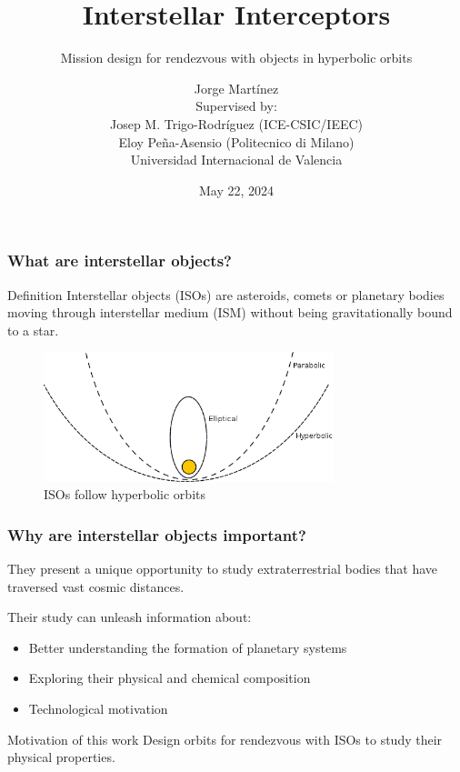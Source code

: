\documentclass[xcolor={dvipsnames}]{beamer}
\title[About Beamer] %
{Interstellar Interceptors}
\subtitle{Mission design for rendezvous with objects in hyperbolic orbits}
\author[Martínez, Jorge] %
{
    Jorge Martínez\\
    \vspace{1cm}
    Supervised by:\\
    \vspace{0.5cm}
    Josep M. Trigo-Rodríguez (ICE-CSIC/IEEC)\\
    Eloy Peña-Asensio (Politecnico di Milano)\\
    \vspace{0.5cm}
    \footnotesize{Universidad Internacional de Valencia}
}
\date{May 22, 2024}
\begin{document}
\frame{\titlepage}

\begin{frame}
\frametitle{What are interstellar objects?}

\begin{block}{Definition}
    Interstellar objects (ISOs) are asteroids, comets or planetary bodies moving
    through interstellar medium (ISM) without being gravitationally bound to a
    star.
\end{block}

\begin{figure}[h]
    \centering
    \includegraphics[width=0.75\textwidth]{fig/static/orbits.png}
    \caption{ISOs follow hyperbolic orbits}
    \label{fig:example_figure}
\end{figure}

\end{frame}

\begin{frame}
\frametitle{Why are interstellar objects important?}

They present a unique opportunity to study extraterrestrial bodies that have
traversed vast cosmic distances.\\[0.5cm]

\pause

Their study can unleash information about:\\[0.5cm]

\begin{itemize}
    \item Better understanding the formation of planetary systems
    \item Exploring their physical and chemical composition
    \item Technological motivation
\end{itemize}

\pause

    \vspace{0.5cm}
    \begin{alertblock}{Motivation of this work}
    \vspace{0.2cm}
    Design orbits for rendezvous with ISOs to study their physical properties.
    \vspace{0.2cm}
\end{alertblock}

\end{frame}
\end{document}
